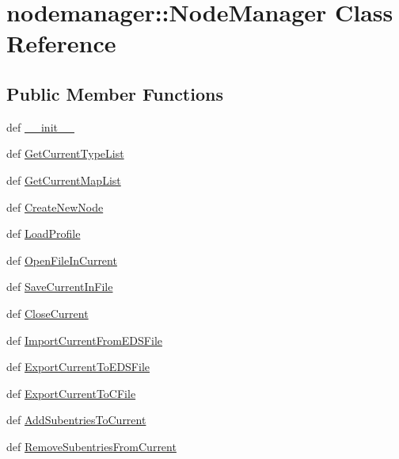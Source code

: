 \hypertarget{classnodemanager_1_1NodeManager}{
\section{nodemanager::Node\-Manager Class Reference}
\label{classnodemanager_1_1NodeManager}
}
\subsection*{Public Member Functions}
\begin{CompactItemize}
\item 
def \hyperlink{classnodemanager_1_1NodeManager_5358e4bbce92e7efa94e8a8af6539d51}{\_\-\_\-init\_\-\_\-}
\item 
def \hyperlink{classnodemanager_1_1NodeManager_24575a8cc619f68041969be904d0f3b0}{Get\-Current\-Type\-List}
\item 
def \hyperlink{classnodemanager_1_1NodeManager_a504ce44097274d42f0f3436d2576361}{Get\-Current\-Map\-List}
\item 
def \hyperlink{classnodemanager_1_1NodeManager_12653bdbfbf0d1a4749dd5f635a5c312}{Create\-New\-Node}
\item 
def \hyperlink{classnodemanager_1_1NodeManager_091f8f1baf230f40550d0bc5f8982258}{Load\-Profile}
\item 
def \hyperlink{classnodemanager_1_1NodeManager_274b68764a3878f456f3f8753bb6cf87}{Open\-File\-In\-Current}
\item 
def \hyperlink{classnodemanager_1_1NodeManager_42b9672fcec8be9ab909f5d94de0c06a}{Save\-Current\-In\-File}
\item 
def \hyperlink{classnodemanager_1_1NodeManager_152b970b624b095775bd072d3eb2a8f2}{Close\-Current}
\item 
def \hyperlink{classnodemanager_1_1NodeManager_b99cd2fc06950e3ffb19982a68205f4c}{Import\-Current\-From\-EDSFile}
\item 
def \hyperlink{classnodemanager_1_1NodeManager_fc83d8f38a6c084d331829f0670c29e1}{Export\-Current\-To\-EDSFile}
\item 
def \hyperlink{classnodemanager_1_1NodeManager_0951abe6610e7b5af6b5850fd4f8dcb5}{Export\-Current\-To\-CFile}
\item 
def \hyperlink{classnodemanager_1_1NodeManager_0eaeb35962cff5c762d96ac4849b237f}{Add\-Subentries\-To\-Current}
\item 
def \hyperlink{classnodemanager_1_1NodeManager_3712711003c4e7e4c5bfe286acc23170}{Remove\-Subentries\-From\-Current}

\end{CompactItemize}
